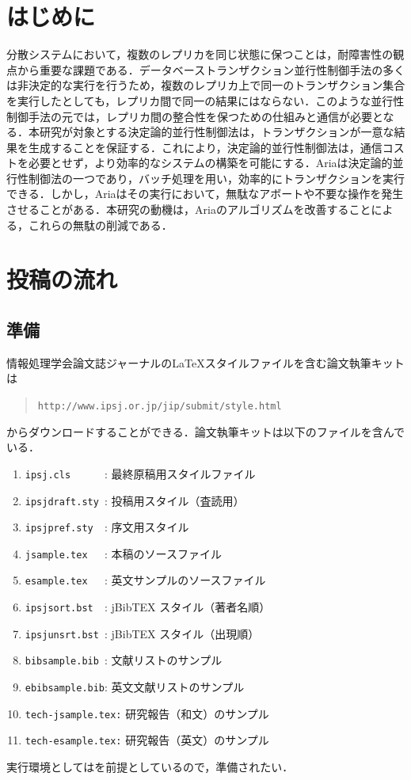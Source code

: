 \documentclass[submit,techrep,noauthor]{ipsj}
\def\|{\verb|}
\begin{document}
\section{はじめに}
分散システムにおいて，複数のレプリカを同じ状態に保つことは，耐障害性の観点から重要な課題である．データベーストランザクション並行性制御手法の多くは非決定的な実行を行うため，複数のレプリカ上で同一のトランザクション集合を実行したとしても，レプリカ間で同一の結果にはならない．このような並行性制御手法の元では，レプリカ間の整合性を保つための仕組みと通信が必要となる．本研究が対象とする決定論的並行性制御法は，トランザクションが一意な結果を生成することを保証する．これにより，決定論的並行性制御法は，通信コストを必要とせず，より効率的なシステムの構築を可能にする．Ariaは決定論的並行性制御法の一つであり，バッチ処理を用い，効率的にトランザクションを実行できる．しかし，Ariaはその実行において，無駄なアボートや不要な操作を発生させることがある．本研究の動機は，Ariaのアルゴリズムを改善することによる，これらの無駄の削減である．




%2
\section{投稿の流れ}


%2.1
\subsection{準備}

情報処理学会論文誌ジャーナルの\LaTeX スタイルファイルを含む論文執筆キットは
\begin{quote}
\small
\|http://www.ipsj.or.jp/jip/submit/style.html|
\end{quote}
からダウンロードすることができる．論文執筆キットは以下のファイルを含んで
いる．
\begin{enumerate}
\item \|ipsj.cls      |: 最終原稿用スタイルファイル
\item \|ipsjdraft.sty |: 投稿用スタイル（査読用）
\item \|ipsjpref.sty  |: 序文用スタイル
\item \|jsample.tex   |: 本稿のソースファイル
\item \|esample.tex   |: 英文サンプルのソースファイル
\item \|ipsjsort.bst  |: jBibTEX スタイル（著者名順）
\item \|ipsjunsrt.bst |: jBibTEX スタイル（出現順）
\item \|bibsample.bib |: 文献リストのサンプル
\item \|ebibsample.bib|: 英文文献リストのサンプル
\item \|tech-jsample.tex:| 研究報告（和文）のサンプル
\item \|tech-esample.tex:| 研究報告（英文）のサンプル
\end{enumerate}
実行環境としては\LaTeXe を前提としているので，準備されたい．
\end{document}
